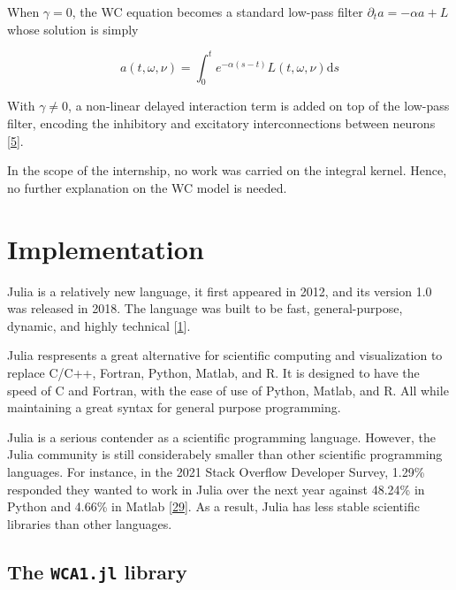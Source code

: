 \documentclass[american,]{article}
\theoremstyle{definition}
\theoremstyle{definition}
\theoremstyle{definition}
\theoremstyle{remark}
\begin{document}
When \(\gamma=0\), the WC equation becomes a standard low-pass filter \(\partial_t a=-\alpha a + L\)
whose solution is simply

\begin{equation}
a(t,\omega,\nu) = \int_0^t e^{-\alpha(s-t)}L(t,\omega,\nu)\mathrm{d}s
\end{equation}

With \(\gamma\neq0\), a non-linear delayed interaction term is added on top
of the low-pass filter, encoding the inhibitory and excitatory interconnections between neurons {[}\protect\hyperlink{ref-boscain2021}{5}{]}.

In the scope of the internship, no work was carried on the integral kernel.
Hence, no further explanation on the WC model is needed.

\pagebreak

\hypertarget{implementation}{%
\section{Implementation}\label{implementation}}

Julia is a relatively new language, it first appeared in 2012,
and its version 1.0 was released in 2018.
The language was built to be fast, general-purpose, dynamic,
and highly technical {[}\protect\hyperlink{ref-julia2018}{1}{]}.

Julia respresents a great alternative for scientific computing
and visualization to replace C/C++, Fortran, Python, Matlab, and R.
It is designed to have the speed of C and Fortran,
with the ease of use of Python, Matlab, and R.
All while maintaining a great syntax for general purpose programming.

Julia is a serious contender as a scientific programming language.
However, the Julia community is still considerabely smaller
than other scientific programming languages.
For instance, in the 2021 Stack Overflow Developer Survey,
1.29\% responded they wanted to work in Julia over the next year
against 48.24\% in Python and 4.66\% in Matlab {[}\protect\hyperlink{ref-so_survey2021}{29}{]}.
As a result, Julia has less stable scientific libraries than
other languages.

\hypertarget{the-wca1.jl-library}{%
\subsection{\texorpdfstring{The \texttt{WCA1.jl} library}{The WCA1.jl library}}\label{the-wca1.jl-library}}
\end{document}
